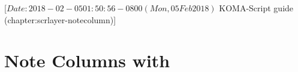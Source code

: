 %
%
%
%
%
%
%
%
% 
%
%
%
%

                 [$Date: 2018-02-05 01:50:56 -0800 (Mon, 05 Feb 2018) $
                  KOMA-Script guide (chapter:scrlayer-notecolumn)]



\chapter{Note Columns with }

